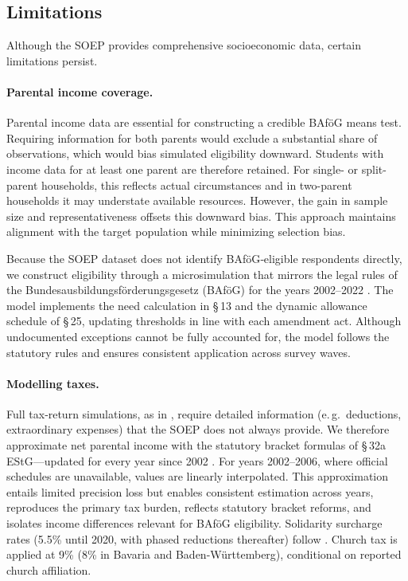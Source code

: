 \subsection{Limitations}

Although the SOEP provides comprehensive socioeconomic data, certain limitations persist.

\paragraph{Parental income coverage.}
Parental income data are essential for constructing a credible BAföG means test. 
Requiring information for both parents would exclude a substantial share of observations, which would bias simulated eligibility downward. 
Students with income data for at least one parent are therefore retained. 
For single- or split-parent households, this reflects actual circumstances and in two-parent households it may understate available resources. 
However, the gain in sample size and representativeness offsets this downward bias. 
This approach maintains alignment with the target population while minimizing selection bias.

Because the SOEP dataset does not identify BAföG‑eligible respondents directly, we construct eligibility through a microsimulation that mirrors the legal rules of the Bundesausbildungsförderungsgesetz (BAföG) for the years 2002–2022 \citep{bafoeg_law,bafoeg20,bafoeg21,bafoeg22,bafoeg23,bafoeg24,bafoeg25,bafoeg26,bafoeg27,bafoeg28,bafoeg29}.  
The model implements the need calculation in §\,13 and the dynamic allowance schedule of §\,25, updating thresholds in line with each amendment act.  
Although undocumented exceptions cannot be fully accounted for, the model follows the statutory rules and ensures consistent application across survey waves.

\paragraph{Modelling taxes.}
Full tax‑return simulations, as in \cite{herber_non-take-up_2019}, require detailed information (e.\,g.\ deductions, extraordinary expenses) that the SOEP does not always provide.  
We therefore approximate net parental income with the statutory bracket formulas of §\,32a EStG—updated for every year since 2002 \citep{estg_law,estg_2025,estg_2024,estg_2023,estg_2022,estg_2021,estg_2020,estg_2019,estg_2018,estg_2017,estg_2016,estg_2015,estg_2014,estg_2013,estg_2012,estg_2007,estg_2006,estg_lohninfo_2012}.  
For years 2002–2006, where official schedules are unavailable, values are linearly interpolated.  
This approximation entails limited precision loss but enables consistent estimation across years, reproduces the primary tax burden, reflects statutory bracket reforms, and isolates income differences relevant for BAföG eligibility.  
Solidarity surcharge rates (5.5\% until 2020, with phased reductions thereafter) follow \citet{solzg_2018,solzg_2019,solzg_2023}.  
Church tax is applied at 9\% (8\% in Bavaria and Baden-Württemberg), conditional on reported church affiliation.

